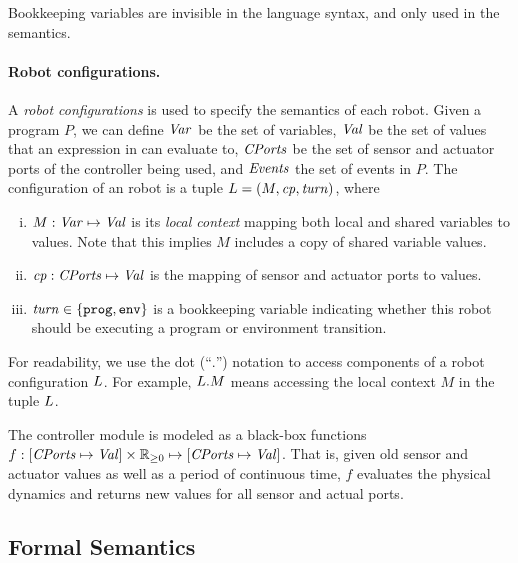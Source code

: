 Bookkeeping variables are invisible in the language syntax, and only used in the semantics.


\paragraph{Robot configurations.}

A \emph{robot configurations} is used to specify the semantics of each robot.
Given a \lgname program $P$, we can define $\mathit{Var}$ be the set of variables,
$\mathit{Val}$ be the set of values that an expression in \lgname can evaluate to,
$\mathit{CPorts}$ be the set of sensor and actuator ports of the controller being used,
and $\mathit{Events}$ the set of events in $P$.
%
%
The configuration of an robot is a tuple $L = ({M},\mathit{cp},\mathit{turn})$, where

\begin{enumerate}[(i)]
\item ${M} : \mathit{Var} \mapsto \mathit{Val}$ is its \emph{local context} mapping both local and shared variables to values.
      Note that this implies $M$ includes a copy of shared variable values.
\item $\mathit{cp} : \mathit{CPorts} \mapsto \mathit{Val}$ is the mapping of sensor and actuator ports to values.
\item $\mathit{turn} \in \{\mathtt{prog},\mathtt{env}\}$ is a bookkeeping variable indicating whether this robot should be executing a program or environment transition.
\end{enumerate}
For readability, we use the dot (``$.$'') notation to access components of a robot configuration $L$.
For example, $L.M$ means accessing the local context $M$ in the tuple $L$.

The controller module is modeled as a black-box functions
$f: [\Cfield \mapsto \Val] \times \nnreals \mapsto [\Cfield \mapsto \Val]$.
That is, given old sensor and actuator values as well as a period of continuous time,
$f$ evaluates the physical dynamics and returns new values for all sensor and actual ports.


\subsection{Formal Semantics}\label{sec:semantics}

